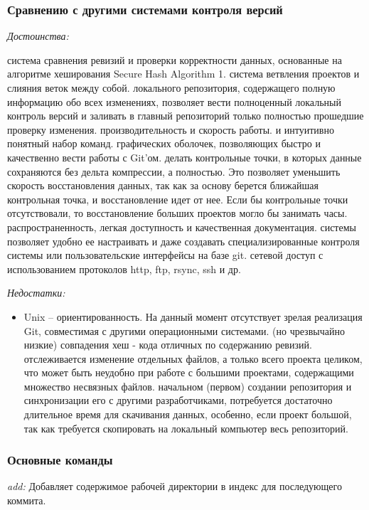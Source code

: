 \documentclass{article}
\begin{document}
		\subsubsection{Сравнению с другими системами контроля версий}
		 	\textit{Достоинства:}
				\begin{itemize}
 система сравнения ревизий и проверки корректности данных, основанные на алгоритме хеширования Secure Hash Algorithm 1.
 система ветвления проектов и слияния веток между собой.
 локального репозитория, содержащего полную информацию обо всех изменениях, позволяет вести полноценный локальный контроль версий и заливать в главный репозиторий только полностью прошедшие проверку изменения.
 производительность и скорость работы.
 и интуитивно понятный набор команд.
 графических оболочек, позволяющих быстро и качественно вести работы с Git’ом.
 делать контрольные точки, в которых данные сохраняются без дельта компрессии, а полностью. Это позволяет уменьшить скорость восстановления данных, так как за основу берется ближайшая контрольная точка, и восстановление идет от нее. Если бы контрольные точки отсутствовали, то восстановление больших проектов могло бы занимать часы.
 распространенность, легкая доступность и качественная документация.
 системы позволяет удобно ее настраивать и даже создавать специализированные контроля системы или пользовательские интерфейсы на базе git.
 сетевой доступ с использованием протоколов http, ftp, rsync, ssh и др.\\
				\end{itemize}
			\textit{Недостатки:}
				\begin{itemize}
\item Unix – ориентированность. На данный момент отсутствует зрелая реализация Git, совместимая с другими операционными системами.
 (но чрезвычайно низкие) совпадения хеш - кода отличных по содержанию ревизий.
 отслеживается изменение отдельных файлов, а только всего проекта целиком, что может быть неудобно при работе с большими проектами, содержащими множество несвязных файлов.
 начальном (первом) создании репозитория и синхронизации его с другими разработчиками, потребуется достаточно длительное время для скачивания данных, особенно, если проект большой, так как требуется скопировать на локальный компьютер весь репозиторий. 
				\end{itemize}
		\subsubsection{Основные команды}
		\textit{add:} Добавляет содержимое рабочей директории в индекс для последующего коммита.\\
		
\end{document}
